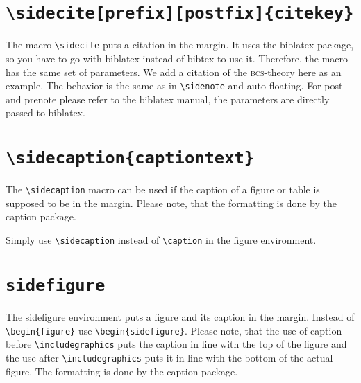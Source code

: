 \documentclass{book}
\begin{document}
\section{\texttt{\textbackslash sidecite[prefix][postfix]\{citekey\}}}
The macro \verb+\sidecite+ puts a citation in the margin. It uses the biblatex package, so you have to go with biblatex instead of bibtex to use it. Therefore, the macro has the same set of parameters. We add a citation of the \textsc{bcs}-theory here as an example. The behavior is the same as in \verb+\sidenote+ and auto floating. For post- and prenote please refer to the biblatex manual, the parameters are directly passed to biblatex.

\section{\texttt{\textbackslash sidecaption\{captiontext\}}}
The \verb+\sidecaption+ macro can be used if the caption of a figure or table is supposed to be in the margin. Please note, that the formatting is done by the caption package. 
\begin{figure}[h]
\fbox{\rule{\textwidth}{0mm}\rule{0mm}{1.5cm}} %
\end{figure}
Simply use \verb+\sidecaption+ instead of \verb+\caption+ in the figure environment. 

\section{\texttt{sidefigure}}
The sidefigure environment puts a figure and its caption in the margin. Instead of \verb+\begin{figure}+ use \verb+\begin{sidefigure}+. Please note, that the use of caption before \verb+\includegraphics+ puts the caption in line with the top of the figure and the use after \verb+\includegraphics+ puts it in line with the bottom of the actual figure. The formatting is done by the caption package.
\begin{sidefigure}
\fbox{\rule{0mm}{1.2cm}\rule{\marginparwidth}{0mm}} %
\caption{This is a figure with its caption in the margin.}
\end{sidefigure}
\end{document}
